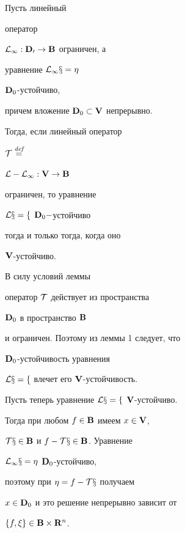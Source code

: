\begin{lem} Пусть линейный


оператор


$\cal L_1:\bold D_0\to\bold B$ ограничен, а


уравнение $\cal L_1x=\eta$\linebreak




$\bold D_0$-устойчиво,


причем вложение $\bold D_0\subset\bold V$ непрерывно.


Тогда, если линейный оператор


$\cal T \overset{\text{{\em def}}}{=}$\linebreak




$\cal L-\cal L_1:\bold V\to\bold B$


ограничен, то уравнение


$\cal L x=f$ $\bold D_0-$устойчиво


тогда и только тогда, когда оно


$\bold V$-устойчиво.


\end{lem}





\begin{pf} В силу условий леммы


оператор $\cal T$ действует из пространства


$\bold D_0$ в пространство $\bold B$


и ограничен. Поэтому из леммы 1 следует, что


$\bold D_0$-устойчивость уравнения


$\cal L x=f$ влечет его $\bold V$-устойчивость.





Пусть теперь уравнение $\cal L x=f$ $\bold V$-устойчиво.


Тогда при любом $f\in\bold B$ имеем $x\in\bold V$,


$\cal T x\in\bold B$ и $f-\cal T x\in\bold B$. Уравнение


$\cal L_1x=\eta$ $\bold D_0$-устойчиво,


поэтому при $\eta=f-\cal T x$ получаем


$x\in\bold D_0$ и это решение непрерывно зависит от


$\{f,\xi\}\in\bold B\times\bold R^n$.


\end{pf}





